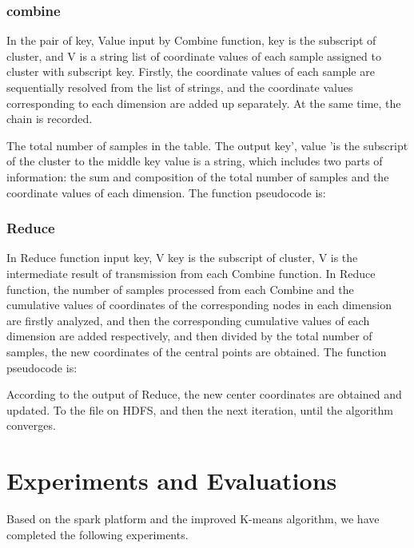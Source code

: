 \documentclass[runningheads]{llncs}
\begin{document}
\subsubsection{combine}
In the pair of key, Value input by Combine function, key is the subscript of cluster, and V is a string list of coordinate values of each sample assigned to cluster with subscript key. Firstly, the coordinate values of each sample are sequentially resolved from the list of strings, and the coordinate values corresponding to each dimension are added up separately. At the same time, the chain is recorded.

The total number of samples in the table. The output key', value 'is the subscript of the cluster to the middle key value is a string, which includes two parts of information: the sum and composition of the total number of samples and the coordinate values of each dimension. The function pseudocode is:

\subsubsection{Reduce}
In Reduce function input key, V key is the subscript of cluster, V is the intermediate result of transmission from each Combine function. In Reduce function, the number of samples processed from each Combine and the cumulative values of coordinates of the corresponding nodes in each dimension are firstly analyzed, and then the corresponding cumulative values of each dimension are added respectively, and then divided by the total number of samples, the new coordinates of the central points are obtained. The function pseudocode is:

According to the output of Reduce, the new center coordinates are obtained and updated. To the file on HDFS, and then the next iteration, until the algorithm converges.

\section{Experiments and Evaluations}
Based on the spark platform and the improved K-means algorithm, we have completed the following experiments. 
\end{document}
